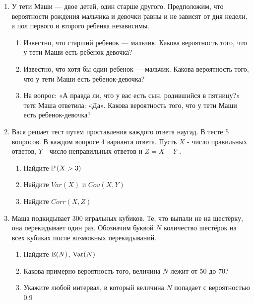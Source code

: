 \documentclass[12pt, a4paper]{article}\usepackage[]{graphicx}\usepackage[]{color}
\begin{document}
				\begin{enumerate}

					\item У тети Маши — двое детей, один старше другого. Предположим, что вероятности рождения мальчика и девочки равны и не зависят от дня недели, а пол первого и второго ребенка независимы.
					\begin{enumerate}
						\item Известно, что старший ребенок — мальчик. Какова
						вероятность того, что у тети Маши есть ребенок-девочка?
						\item Известно, что хотя бы один ребенок — мальчик. Какова
						вероятность того, что у тети Маши есть ребенок-девочка?
						\item На вопрос: «А правда ли, что у вас есть сын, родившийся в пятницу?» тетя Маша ответила: «Да». Какова
						вероятность того, что у тети Маши есть ребенок-девочка?
					\end{enumerate}


					\item Вася решает тест путем проставления каждого ответа наугад. В тесте 5 вопросов. В каждом вопросе 4 варианта ответа. Пусть  $X$  - число правильных ответов,  $Y$  - число неправильных ответов и  $Z=X-Y$ .

					\begin{enumerate}
						\item Найдите  $\P\left(X>3\right)$

						\item Найдите  $Var\left(X\right)$  и  $Cov\left(X,Y\right)$

						\item Найдите  $Corr\left(X,Z\right)$
					\end{enumerate}


					\item Маша подкидывает 300 игральных кубиков. Те, что выпали не на шестёрку, она перекидывает один раз. Обозначим буквой $N$ количество шестёрок на всех кубиках после возможных перекидываний.
					\begin{enumerate}
						\item Найдите $\E(N)$, $\Var(N)$
						\item Какова примерно вероятность того, величина $N$ лежит от 50 до 70?
						\item Укажите любой интервал, в который величина $N$ попадает с вероятностью 0.9
					\end{enumerate}

				\end{enumerate}
\end{document}
